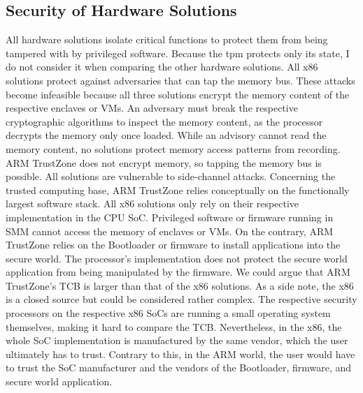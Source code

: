 \subsection{Security of Hardware Solutions}
All hardware solutions isolate critical functions to protect them from being
tampered with by privileged software. Because the \gls{tpm} protects only its
state, I do not consider it when comparing the other hardware solutions. All x86
solutions protect against adversaries that can tap the memory bus. These attacks
become infeasible because all three solutions encrypt the memory content of the
respective enclaves or VMs. An adversary must break the respective cryptographic
algorithms to inspect the memory content, as the processor decrypts the memory
only once loaded. While an advisory cannot read the memory content, no solutions
protect memory access patterns from recording. ARM TrustZone does not encrypt
memory, so tapping the memory bus is possible. All solutions are vulnerable to
side-channel attacks. Concerning the trusted computing base, ARM TrustZone
relies conceptually on the functionally largest software stack. All x86
solutions only rely on their respective implementation in the CPU SoC.
Privileged software or firmware running in SMM cannot access the memory of
enclaves or VMs. On the contrary, ARM TrustZone relies on the Bootloader or
firmware to install applications into the secure world. The processor's
implementation does not protect the secure world application from being
manipulated by the firmware. We could argue that ARM TrustZone's TCB is larger
than that of the x86 solutions. As a side note, the x86 is a closed source but
could be considered rather complex. The respective security processors on the
respective x86 SoCs are running a small operating system themselves, making it
hard to compare the TCB. Nevertheless, in the x86, the whole SoC implementation
is manufactured by the same vendor, which the user ultimately has to trust.
Contrary to this, in the ARM world, the user would have to trust the SoC
manufacturer and the vendors of the Bootloader, firmware, and secure world
application.\\
